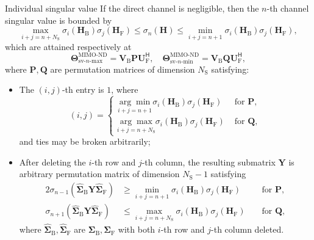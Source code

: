 \documentclass[final,xcolor={table}]{beamer}
\newlength{\colwidth}
\begin{document}
\begin{frame}[t]
\begin{columns}[t]
\begin{column}{\colwidth}
			\setcounter{coro}{2}

			\begin{coro}{Individual singular value}{}
				\setlength{\leftskip}{\leftmargini}
				\setlength{\rightskip}{\leftmargini}
				If the direct channel is negligible,
				then the $n$-th channel singular value is bounded by
				\begin{equation*}
					\max_{i+j=n+N_\mathrm{S}} \sigma_i(\mathbf{H}_\mathrm{B}) \sigma_j(\mathbf{H}_\mathrm{F}) \le \sigma_n(\mathbf{H}) \le \min_{i+j=n+1} \sigma_i(\mathbf{H}_\mathrm{B}) \sigma_j(\mathbf{H}_\mathrm{F}),
				\end{equation*}
				which are attained respectively at
				\begin{equation*}
					\mathbf{\Theta}_{\text{sv-}n\text{-max}}^\text{MIMO-ND} = \mathbf{V}_\mathrm{B} \mathbf{P} \mathbf{U}_\mathrm{F}^\mathsf{H}, \quad \mathbf{\Theta}_{\text{sv-}n\text{-min}}^\text{MIMO-ND} = \mathbf{V}_\mathrm{B} \mathbf{Q} \mathbf{U}_\mathrm{F}^\mathsf{H},
				\end{equation*}
				where $\mathbf{P}, \mathbf{Q}$ are permutation matrices of dimension $N_\mathrm{S}$ satisfying:
				\begin{itemize}\color{black}
					\item The $(i, j)$-th entry is $1$, where
					\begin{equation*}
						(i, j) =
						\begin{cases}
							\underset{i+j=n+1}{\arg\min} \sigma_i(\mathbf{H}_\mathrm{B}) \sigma_j(\mathbf{H}_\mathrm{F}) & \text{ for } \mathbf{P}, \\
							\underset{i+j=n+N_\mathrm{S}}{\arg\max} \sigma_i(\mathbf{H}_\mathrm{B}) \sigma_j(\mathbf{H}_\mathrm{F}) & \text{ for } \mathbf{Q},
						\end{cases}
					\end{equation*}
					and ties may be broken arbitrarily;
					\item After deleting the $i$-th row and $j$-th column, the resulting submatrix $\mathbf{Y}$ is arbitrary permutation matrix of dimension $N_\mathrm{S}-1$ satisfying
					\begin{alignat*}{2}
						\sigma_{n{-}1}(\hat{\mathbf{\Sigma}}_{\mathrm{B}} \mathbf{Y} \hat{\mathbf{\Sigma}}_{\mathrm{F}}) & {\ge} \min_{i+j=n+1} \sigma_i(\mathbf{H}_\mathrm{B}) \sigma_j(\mathbf{H}_\mathrm{F}) && \text{ for } \mathbf{P}, \\
						\sigma_{n{+}1}(\hat{\mathbf{\Sigma}}_{\mathrm{B}} \mathbf{Y} \hat{\mathbf{\Sigma}}_{\mathrm{F}}) & {\le} \max_{i+j=n+N_\mathrm{S}} \sigma_i(\mathbf{H}_\mathrm{B}) \sigma_j(\mathbf{H}_\mathrm{F}) && \text{ for } \mathbf{Q},
					\end{alignat*}
					where $\hat{\mathbf{\Sigma}}_{\mathrm{B}}, \hat{\mathbf{\Sigma}}_{\mathrm{F}}$ are ${\mathbf{\Sigma}}_{\mathrm{B}}, {\mathbf{\Sigma}}_{\mathrm{F}}$ with both $i$-th row and $j$-th column deleted.
				\end{itemize}
			\end{coro}


\end{column}
\end{columns}
\end{frame}
\end{document}
